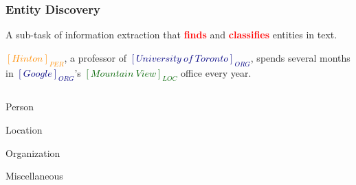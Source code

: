 \documentclass{beamer}
\begin{document}
\begin{frame}
\frametitle{Entity Discovery}
\begin{definition}
	A sub-task of information extraction that \textcolor{red}{\textbf{finds}} and \textcolor{red}{\textbf{classifies}} entities in text.
\end{definition}
\begin{example}
	\textcolor{darkorange}{$[Hinton]_{PER}$}, 
	a professor of \textcolor{navy}{$[University\ of\ Toronto]_{ORG}$}, 
	spends several months in \textcolor{navy}{$[Google]_{ORG}$}'s 
	\textcolor{darkgreen}{$[Mountain\ View]_{LOC}$} office every year.
\end{example}
\begin{columns}
	\begin{description}
		\setlength\itemsep{0.05em}
		\small
		\item[\textcolor{darkorange}{PER}] Person
		\item[\textcolor{darkgreen}{LOC}] Location
		\item[\textcolor{navy}{ORG}] Organization
		\item[\textcolor{darkmagenta}{MISC}] Miscellaneous
	\end{description}
\end{columns}
\end{frame}
\end{document}
